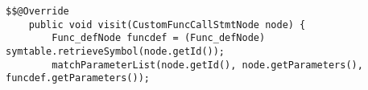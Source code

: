\begin{lstlisting}[caption={Visit method for CustomFuncCallStmtNode in FuncStructureVisitor}, label={customFuncCall}]
    $$@Override
    public void visit(CustomFuncCallStmtNode node) {
        Func_defNode funcdef = (Func_defNode) symtable.retrieveSymbol(node.getId());
        matchParameterList(node.getId(), node.getParameters(), funcdef.getParameters());
\end{lstlisting}